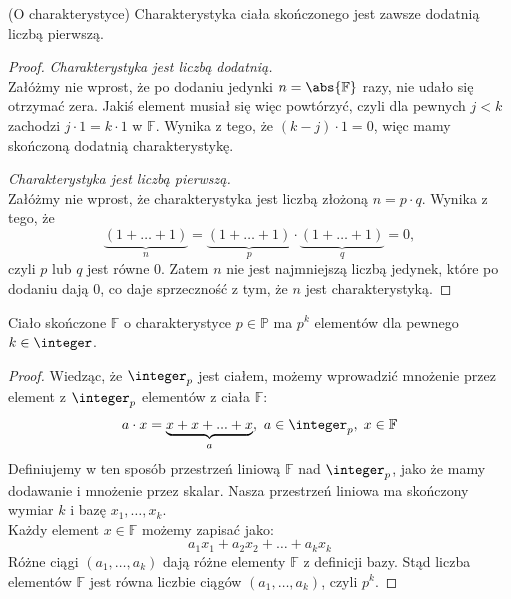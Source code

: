 \begin{theorem}(O charakterystyce)
	Charakterystyka ciała skończonego jest zawsze dodatnią liczbą pierwszą.
\end{theorem}
\begin{proof}
	\textit{Charakterystyka jest liczbą dodatnią.} \\
	Załóżmy nie wprost, że po dodaniu jedynki \( n = \abs{\mathbb{F}} \) razy, nie udało się otrzymać zera. Jakiś element musiał się więc powtórzyć, czyli dla pewnych \( j < k \) zachodzi \( j \cdot 1 = k \cdot 1 \) w \( \mathbb{F} \).
	Wynika z tego, że \( (k - j) \cdot 1 = 0 \), więc mamy skończoną dodatnią charakterystykę.

	\textit{Charakterystyka jest liczbą pierwszą.} \\
	Załóżmy nie wprost, że charakterystyka jest liczbą złożoną \( n = p \cdot q \). Wynika z tego, że
	\[
		\underbrace{(1 + \dots + 1)}_n = \underbrace{(1 + \dots + 1)}_p \cdot \underbrace{(1 + \dots + 1)}_q = 0,
	\]
	czyli \( p \) lub \( q \) jest równe 0. Zatem \( n \) nie jest najmniejszą liczbą jedynek, które po dodaniu dają 0, co daje sprzeczność z tym, że \( n \) jest charakterystyką.
\end{proof}

\begin{theorem}
	Ciało skończone \( \mathbb{F} \)  o charakterystyce \( p \in \mathbb{P} \) ma \( p^k \) elementów dla pewnego \( k \in \integer \).
\end{theorem}
\begin{proof}
	Wiedząc, że \( \integer_p \) jest ciałem, możemy wprowadzić mnożenie przez element z \( \integer_p \) elementów z ciała \( \mathbb{F} \):
	\[
		a \cdot x = \underbrace{x + x + ... + x}_a, \ a \in \integer_p,\; x \in \mathbb{F}
	\]
	Definiujemy w ten sposób przestrzeń liniową \( \mathbb{F} \) nad \( \integer_p \), jako że mamy dodawanie i mnożenie przez skalar. Nasza przestrzeń liniowa ma skończony wymiar \( k \) i bazę \( x_1, \dots, x_k \). \\
	Każdy element \( x \in \mathbb{F} \) możemy zapisać jako:
	\[
		a_1x_1 + a_2x_2 + \dots + a_kx_k
	\]
	Różne ciągi \( (a_1, \dots, a_k) \) dają różne elementy \( \mathbb{F} \) z definicji bazy. Stąd liczba elementów \( \mathbb{F} \) jest równa liczbie ciągów \( (a_1, \dots, a_k) \), czyli \( p^k \).
\end{proof}